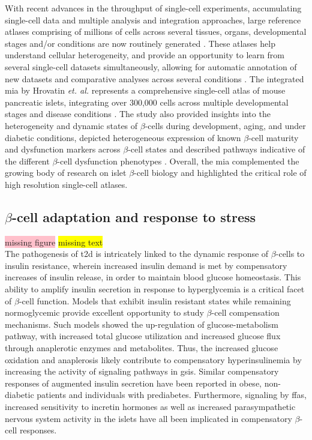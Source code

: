 With recent advances in the throughput of single-cell experiments, accumulating single-cell data and multiple analysis and integration approaches, large reference atlases comprising of millions of cells across several tissues, organs, developmental stages and/or conditions are now routinely generated \textbf{\cite{regev_human_nodate}}. These atlases help understand cellular heterogeneity, and provide an opportunity to learn from several single-cell datasets simultaneously, allowing for automatic annotation of new datasets and comparative analyses across several conditions \textbf{\cite{rood_impact_2022,lotfollahi_mapping_2021}}. The integrated \gls{mia} by Hrovatin \textit{et. al.} represents a comprehensive single-cell atlas of mouse pancreatic islets, integrating over 300,000 cells across multiple developmental stages and disease conditions \textbf{\cite{hrovatin_delineating_2023}}. The study also provided insights into the heterogeneity and dynamic states of $\beta$-cells during development, aging, and under diabetic conditions, depicted heterogeneous expression of known $\beta$-cell maturity and dysfunction markers across $\beta$-cell states and described pathways indicative of the different $\beta$-cell dysfunction phenotypes \textbf{\cite{hrovatin_delineating_2023}}. Overall, the \gls{mia} complemented the growing body of research on islet $\beta$-cell biology and highlighted the critical role of high resolution single-cell atlases.


\subsection{$\beta$-cell adaptation and response to stress}
\colorbox{pink}{missing figure} \colorbox{yellow}{missing text} \\

The pathogenesis of \gls{t2d} is intricately linked to the dynamic response of $\beta$-cells to insulin resistance, wherein increased insulin demand is met by compensatory increases of insulin release, in order to maintain blood glucose homeostasis. This ability to amplify insulin secretion in response to hyperglycemia is a critical facet of $\beta$-cell function. Models that exhibit insulin resistant states while remaining normoglycemic provide excellent opportunity to study $\beta$-cell compensation mechanisms. Such models showed the up-regulation of glucose-metabolism pathway, with increased total glucose utilization and increased glucose flux through anaplerotic enzymes and metabolites. Thus, the increased glucose oxidation and anaplerosis likely contribute to compensatory hyperinsulinemia by increasing the activity of signaling pathways in \gls{gsis}. Similar compensatory responses of augmented insulin secretion have been reported in obese, non-diabetic patients and individuals with prediabetes. Furthermore, signaling by \glspl{ffa}, increased sensitivity to incretin hormones as well as increased parasympathetic nervous system activity in the islets have all been implicated in compensatory $\beta$-cell responses.\\

